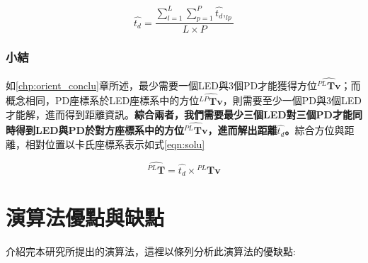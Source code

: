        \begin{equation}
            \label{eqn:average_dis}
            \hat{t_d }= \frac{\sum^{L}_{l=1}\sum^{P}_{p=1} \hat{t_d },_{lp} }{L\times P}
        \end{equation}

        \subsubsection{小結}

        如\ref{chp:orient_conclu}章所述，最少需要一個LED與3個PD才能獲得方位$\hat{{^{PL}\boldsymbol{Tv}}}$；而概念相同，PD座標系於LED座標系中的方位$\hat{{^{LP}\boldsymbol{Tv}}}$，則需要至少一個PD與3個LED才能解，進而得到距離資訊。\textbf{綜合兩者，我們需要最少三個LED對三個PD才能同時得到LED與PD於對方座標系中的方位$\hat{{^{PL}\boldsymbol{Tv}}}$，進而解出距離$\hat{t_d}$。}綜合方位與距離，相對位置以卡氏座標系表示如式\ref{eqn:solu}


        \begin{equation}
            \label{eqn:sollu}
            \hat{^{PL}\boldsymbol{T} }= \hat{t_d} \times {^{PL}\boldsymbol{Tv}} 
        \end{equation}

\section{演算法優點與缺點}
\label{chp:algorithm_ad_dis}


介紹完本研究所提出的演算法，這裡以條列分析此演算法的優缺點:


